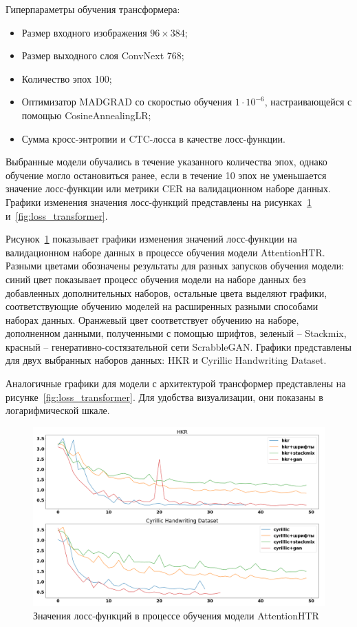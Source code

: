 Гиперпараметры обучения трансформера:
\begin{itemize}
    \item Размер входного изображения $96 \times 384$;
    \item Размер выходного слоя ConvNext 768;
    \item Количество эпох 100;
    \item Оптимизатор MADGRAD со скоростью обучения $1 \cdot 10^{-6}$, настраивающейся с помощью CosineAnnealingLR;
    \item Сумма кросс-энтропии и CTC-лосса в качестве лосс-функции.
\end{itemize}

Выбранные модели обучались в течение указанного количества эпох, однако обучение могло остановиться ранее, если
в течение 10 эпох не уменьшается значение лосс-функции или метрики CER на валидационном наборе данных.
Графики изменения значения лосс-функций представлены на рисунках~\ref{fig:loss_attention} и~\ref{fig:loss_transformer}.

Рисунок~\ref{fig:loss_attention} показывает графики изменения значений лосс-функции на валидационном наборе данных в процессе обучения модели AttentionHTR.
Разными цветами обозначены результаты для разных запусков обучения модели:
синий цвет показывает процесс обучения модели на наборе данных без добавленных дополнительных наборов, остальные цвета
выделяют графики, соответствующие обучению моделей на расширенных разными способами наборах данных.
Оранжевый цвет соответствует обучению на наборе, дополненном данными, полученными с помощью шрифтов, зеленый -- Stackmix,
красный -- генеративно-состязательной сети ScrabbleGAN.
Графики представлены для двух выбранных наборов данных: HKR и Cyrillic Handwriting Dataset.

Аналогичные графики для модели с архитектурой трансформер представлены на рисунке~\ref{fig:loss_transformer}.
Для удобства визуализации, они показаны в логарифмической шкале.

\begin{figure}[h!]
    \centering
    \includegraphics[width=\textwidth]{img/losses_attention}
    \caption{Значения лосс-функций в процессе обучения модели AttentionHTR}
    \label{fig:loss_attention}
\end{figure}

